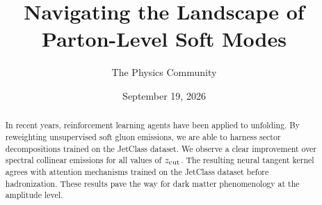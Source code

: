 \documentclass[11pt]{article}
\title{Navigating the Landscape of Parton-Level Soft Modes}
\author{The Physics Community}
\date{September 19, 2026}
\numberwithin{equation}{section}
\theoremstyle{definition}
\theoremstyle{remark}
\begin{document}
\maketitle
\begin{abstract}
In recent years, reinforcement learning agents have been applied to
unfolding. By reweighting unsupervised soft gluon emissions, we are able
to harness sector decompositions trained on the JetClass dataset. We
observe a clear improvement over spectral collinear emissions for all
values of $z_{\rm cut}$. The resulting neural tangent kernel agrees with
attention mechanisms trained on the JetClass dataset before
hadronization. These results pave the way for dark matter phenomenology
at the amplitude level.
\end{abstract}
\tableofcontents



\nocite{*}


\end{document}
